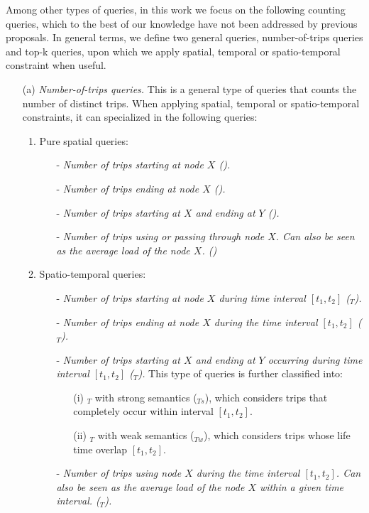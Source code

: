 	Among other types of queries, in this work we focus on the following counting queries, which to the best of our knowledge have not been  addressed by previous proposals. In general terms, we define two general queries, number-of-trips queries and top-k queries, upon which we apply spatial, temporal or spatio-temporal constraint when useful.

	\begin{itemize}
		\item[(a)] {\em Number-of-trips queries.} This is a general type of queries that counts the number of distinct trips. When applying spatial, temporal or spatio-temporal constraints, it can specialized in the following queries:
		
		\begin{enumerate}
			\item Pure spatial queries:
			\begin{itemize}
				\item[-] {\em Number of trips starting at node $X$ (\startX).}
				\item[-] {\em Number of trips ending at node $X$ (\endX).} 
				\item[-] {\em Number of trips starting at $X$ and ending at $Y$ (\XtoY).}
				\item[-] {\em Number of trips using or passing through node $X$. Can also be seen as the average load of the node $X$. (\loadX)}
			\end{itemize}
			
			\item Spatio-temporal queries:
			\begin{itemize}
				\item[-] {\em Number of trips starting at node $X$ during time interval $[t_1,t_2]$ (\startX$_T$).}
				\item[-] {\em Number of trips ending at node $X$ during the time interval $[t_1,t_2]$ (\endX$_T$). }
				\item[-] {\em Number of trips starting at $X$ and ending at $Y$ occurring during  time interval $[t_1,t_2]$ (\XtoY$_T$).} This type of queries is further classified into: 
				\begin{itemize}
				    \item[(i)] \XtoY$_T$ with strong semantics (\XtoY$_{Ts}$), which considers trips that completely occur within interval $[t_1,t_2]$.
				    \item[(ii)] \XtoY$_T$ with weak semantics (\XtoY$_{Tw}$), which considers trips whose life time overlap $[t_1,t_2]$.
				\end{itemize}
				\item[-] {\em Number of trips using node $X$ during the time interval $[t_1,t_2]$. Can also be seen as the average load of the node $X$ within a given time interval. (\loadX$_T$).}
			\end{itemize}
			

\end{enumerate}
\end{itemize}
